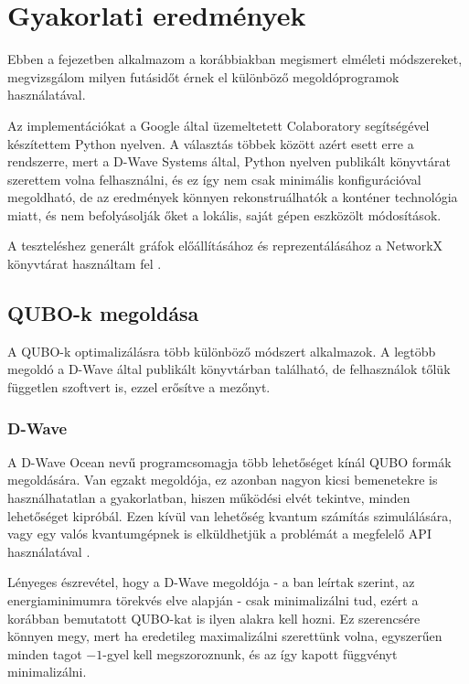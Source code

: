 
\chapter{Gyakorlati eredmények}\label{chap:practice}
Ebben a fejezetben alkalmazom a korábbiakban megismert elméleti módszereket, megvizsgálom milyen futásidőt érnek el különböző megoldóprogramok használatával.

Az implementációkat a Google által üzemeltetett Colaboratory segítségével készítettem Python nyelven. A választás többek között azért esett erre a rendszerre, mert a D-Wave Systems által, Python nyelven publikált könyvtárat szerettem volna felhasználni, és ez így nem csak minimális konfigurációval megoldható, de az eredmények könnyen rekonstruálhatók a konténer technológia miatt, és nem befolyásolják őket a lokális, saját gépen eszközölt módosítások.

A teszteléshez generált gráfok előállításához és reprezentálásához a NetworkX könyvtárat használtam fel \cite{NetworkX}.

\section{QUBO-k megoldása}

A QUBO-k optimalizálásra több különböző módszert alkalmazok. A legtöbb megoldó a D-Wave által publikált könyvtárban található, de felhasználok tőlük független szoftvert is, ezzel erősítve a mezőnyt. 

\subsection{D-Wave}\label{sec:practiceDwave}

A D-Wave Ocean nevű programcsomagja több lehetőséget kínál QUBO formák megoldására. Van egzakt megoldója, ez azonban nagyon kicsi bemenetekre is használhatatlan a gyakorlatban, hiszen működési elvét tekintve, minden lehetőséget kipróbál. Ezen kívül van lehetőség kvantum számítás szimulálására, vagy egy valós kvantumgépnek is elküldhetjük a problémát a megfelelő API használatával \cite{DWaveOcean}.

Lényeges észrevétel, hogy a D-Wave megoldója - a ban leírtak szerint, az energiaminimumra törekvés elve alapján - csak minimalizálni tud, ezért a korábban bemutatott QUBO-kat is ilyen alakra kell hozni. Ez szerencsére könnyen megy, mert ha eredetileg maximalizálni szerettünk volna, egyszerűen minden tagot $-1$-gyel kell megszoroznunk, és az így kapott függvényt minimalizálni.

